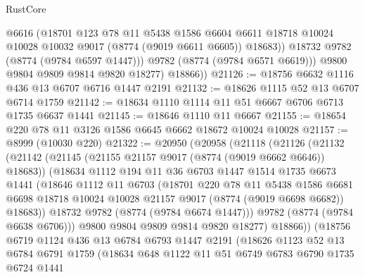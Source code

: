 \begin{lexlean}{RustCore}
\begin{coremodule}
                @6616
                (@18701
                  @123
                  @78
                  @11
                  @5438
                  @1586
                  @6604
                  @6611
                  @18718
                  @10024
                  @10028
                  @10032
                  @9017
                  (@8774 (@9019 @6611 @6605))
                  @18683))
              @18732
              @9782
              (@8774 (@9784 @6597 @1447)))
            @9782
            (@8774 (@9784 @6571 @6619)))
          @9800
          @9804
          @9809
          @9814
          @9820
          @18277)
        @18866))
@21126 := @18756 @6632 @1116 @436 @13 @6707 @6716 @1447 @2191
@21132 := @18626 @1115 @52 @13 @6707 @6714 @1759
@21142 := @18634 @1110 @1114 @11 @51 @6667 @6706 @6713 @1735 @6637 @1441
@21145 := @18646 @1110 @11 @6667
@21155 := @18654 @220 @78 @11 @3126 @1586 @6645 @6662 @18672 @10024 @10028
@21157 := @8999 (@10030 @220)
@21322 := @20950
    (@20958
      (@21118
        (@21126
          (@21132
            (@21142
              (@21145 (@21155 @21157 @9017 (@8774 (@9019 @6662 @6646)) @18683))
              (@18634
                @1112
                @194
                @11
                @36
                @6703
                @1447
                @1514
                @1735
                @6673
                @1441
                (@18646
                  @1112
                  @11
                  @6703
                  (@18701
                    @220
                    @78
                    @11
                    @5438
                    @1586
                    @6681
                    @6698
                    @18718
                    @10024
                    @10028
                    @21157
                    @9017
                    (@8774 (@9019 @6698 @6682))
                    @18683))
                @18732
                @9782
                (@8774 (@9784 @6674 @1447)))
              @9782
              (@8774 (@9784 @6638 @6706)))
            @9800
            @9804
            @9809
            @9814
            @9820
            @18277)
          @18866))
      (@18756
        @6719
        @1124
        @436
        @13
        @6784
        @6793
        @1447
        @2191
        (@18626
          @1123
          @52
          @13
          @6784
          @6791
          @1759
          (@18634
            @648
            @1122
            @11
            @51
            @6749
            @6783
            @6790
            @1735
            @6724
            @1441

\end{coremodule}
\end{lexlean}
